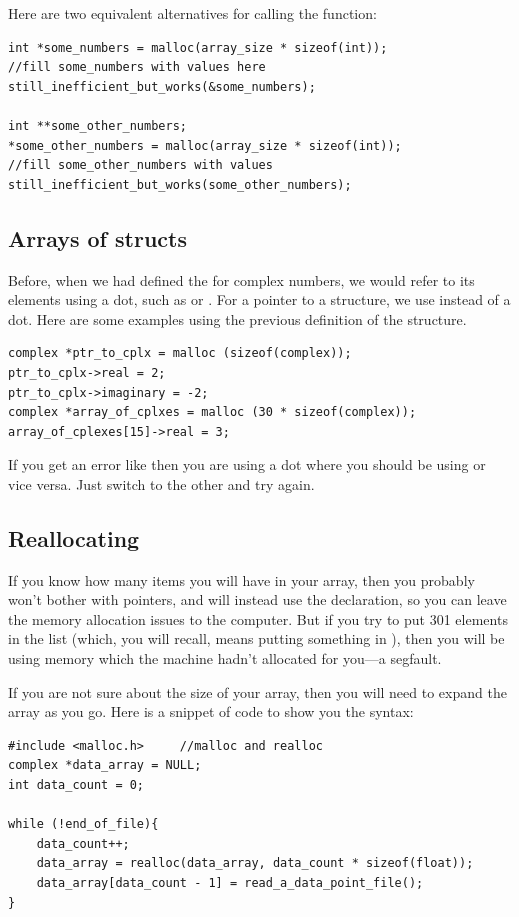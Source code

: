 \documentclass[12pt]{article}
\makeatletter
\def\cind#1{\index{#1@\cinline{#1}}\cinline{#1}}
\makeatother
\begin{document}
Here are two equivalent alternatives for calling the function:
\begin{lstlisting}
int *some_numbers = malloc(array_size * sizeof(int));
//fill some_numbers with values here
still_inefficient_but_works(&some_numbers);

int **some_other_numbers;
*some_other_numbers = malloc(array_size * sizeof(int));
//fill some_other_numbers with values
still_inefficient_but_works(some_other_numbers);
\end{lstlisting}

\subsection{Arrays of structs}	
Before, when we had defined the \cind{struct} for complex numbers, we would refer to its elements using a
dot, such as  or . For a pointer to a structure, we use \cind{$->$} instead of 
a dot.  Here are some examples using the previous definition of the  structure.
\begin{lstlisting}
complex *ptr_to_cplx = malloc (sizeof(complex));
ptr_to_cplx->real = 2;
ptr_to_cplx->imaginary = -2;
complex *array_of_cplxes = malloc (30 * sizeof(complex));
array_of_cplexes[15]->real = 3;
\end{lstlisting}

If you get an error like  then you are
using a dot where you should be using \cind{$->$} or vice versa. Just switch to the other and try again.


\subsection{Reallocating} If you know how many items you will have
in your array, then you probably won't bother with pointers, and will
instead use the  declaration, so you can leave
the memory allocation issues to the computer. But if you try to put 301
elements in the list (which, you will recall, means putting something
in ), then you will be using memory which the
machine hadn't
allocated for you---a segfault.

If you are not sure about the size of your array, then you will need to
expand the array as you go. Here is a snippet of code to show you the syntax:
\begin{lstlisting}
#include <malloc.h>     //malloc and realloc
complex *data_array = NULL;
int data_count = 0;

while (!end_of_file){
    data_count++;
    data_array = realloc(data_array, data_count * sizeof(float));
    data_array[data_count - 1] = read_a_data_point_file();
}
\end{lstlisting}
\end{document}
